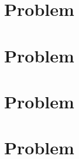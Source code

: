 \documentclass{article}
\numberwithin{equation}{section} %
\numberwithin{figure}{section} %
\begin{document}

\section{Problem}  %
\newpage \section{Problem}  %
\newpage \section{Problem}  %
\newpage \section{Problem}  %
\end{document}

